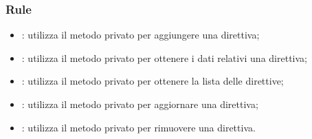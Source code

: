 \subsubsection{Rule}
\begin{itemize}
\item {}: utilizza il metodo privato  per aggiungere una direttiva;

\item {}: utilizza il metodo privato  per ottenere i dati relativi una direttiva;

\item {}: utilizza il metodo privato  per ottenere la lista delle direttive;

\item {}: utilizza il metodo privato  per aggiornare una direttiva;

\item {}: utilizza il metodo privato  per rimuovere una direttiva.


\end{itemize}




